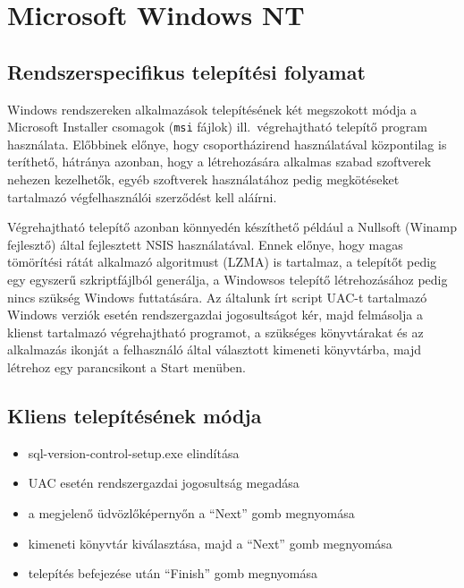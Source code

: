 \documentclass[a4paper,12pt]{article}
\begin{document}
\clearpage
\section{Microsoft Windows NT}

\subsection{Rendszerspecifikus telepítési folyamat}

Windows rendszereken alkalmazások telepítésének két megszokott módja a Microsoft Installer
csomagok (\verb|msi| fájlok) ill.\ végrehajtható telepítő program használata. Előbbinek
előnye, hogy csoportházirend használatával központilag is teríthető, hátránya azonban,
hogy a létrehozására alkalmas szabad szoftverek nehezen kezelhetők, egyéb szoftverek
használatához pedig megkötéseket tartalmazó végfelhasználói szerződést kell aláírni.

Végrehajtható telepítő azonban könnyedén készíthető például a Nullsoft (Winamp fejlesztő)
által fejlesztett NSIS használatával. Ennek előnye, hogy magas tömörítési rátát alkalmazó
algoritmust (LZMA) is tartalmaz, a telepítőt pedig egy egyszerű szkriptfájlból generálja,
a Windowsos telepítő létrehozásához pedig nincs szükség Windows futtatására. Az általunk
írt script UAC-t tartalmazó Windows verziók esetén rendszergazdai jogosultságot kér, majd
felmásolja a klienst tartalmazó végrehajtható programot, a szükséges könyvtárakat és
az alkalmazás ikonját a felhasználó által választott kimeneti könyvtárba, majd létrehoz
egy parancsikont a Start menüben.

\subsection{Kliens telepítésének módja}

\begin{itemize}
\item sql-version-control-setup.exe elindítása
\item UAC esetén rendszergazdai jogosultság megadása
\item a megjelenő üdvözlőképernyőn a ``Next'' gomb megnyomása
\item kimeneti könyvtár kiválasztása, majd a ``Next'' gomb megnyomása
\item telepítés befejezése után ``Finish'' gomb megnyomása
\end{itemize}
\end{document}
